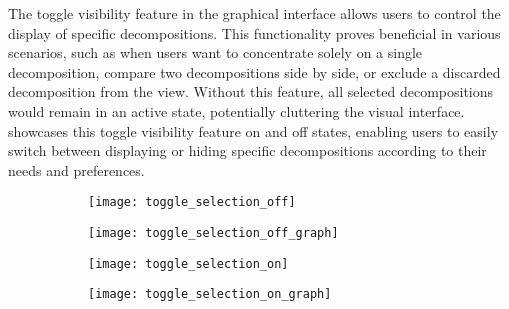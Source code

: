 The toggle visibility feature in the graphical interface allows users to
control the display of specific decompositions. This functionality proves
beneficial in various scenarios, such as when users want to concentrate solely
on a single decomposition, compare two decompositions side by side, or exclude
a discarded decomposition from the view. Without this feature, all selected
decompositions would remain in an active state, potentially cluttering the
visual interface.  showcases this toggle
visibility feature on and off states, enabling users to easily switch between
displaying or hiding specific decompositions according to their needs and
preferences.

\begin{figure*}[!htb]
  \caption{Toggle Decomposition} \label{fig:toggle_decomposition}
  \centering
  \begin{subfigure}[!htb]{1\textwidth}
    \caption{Off State}
    \centering
    \begin{subfigure}[b]{0.49\textwidth}
      \centering
      \texttt{[image: toggle\_selection\_off]}
    \end{subfigure}
    \hspace{-0.1cm}
    \begin{subfigure}[b]{0.49\textwidth}
      \centering
      \texttt{[image: toggle\_selection\_off\_graph]}
    \end{subfigure}
  \end{subfigure}
  \hfill
  \begin{subfigure}[!htb]{1\textwidth}
    \caption{On State}
    \centering
    \begin{subfigure}[b]{0.49\textwidth}
      \centering
      \texttt{[image: toggle\_selection\_on]}
    \end{subfigure}
    \hspace{-0.1cm}
    \begin{subfigure}[b]{0.49\textwidth}
      \centering
      \texttt{[image: toggle\_selection\_on\_graph]}
    \end{subfigure}
  \end{subfigure}
\end{figure*}
